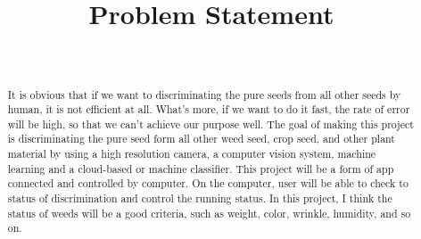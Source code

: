 \documentclass[10pt,draftclsnofoot,onecolumn,journal,compsoc]{IEEEtran}
\title{Problem Statement}
\author{
  \IEEEauthorblockN{Cong Yang} \\
  \IEEEauthorblockA{CS 461 F2018 \\ Oregon State University}
}
\begin{document}
\maketitle
\newpage
\tableofcontents
\newpage

\newpage
\begin{abstract}
   It is obvious that if we want to discriminating the pure seeds from all other seeds by human, it is not efficient at all. What’s more, if we want to do it fast, the rate of error will be high, so that we can’t achieve our purpose well. The goal of making this project is discriminating the pure seed form all other weed seed, crop seed, and other plant material by using a high resolution camera, a computer vision system, machine learning and a cloud-based or machine classifier. This project will be a form of app connected and controlled by computer. On the computer, user will be able to check to status of discrimination and control the running status. In this project, I think the status of weeds will be a good criteria, such as weight, color, wrinkle, humidity, and so on.
\end{abstract}

\newpage
\end{document}
